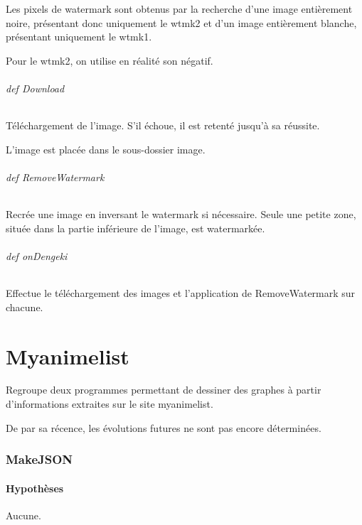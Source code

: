 \documentclass[a4paper,12pt]{article}
\begin{document}
Les pixels de watermark sont obtenus par la recherche d'une image entièrement noire, présentant donc uniquement le wtmk2 et d'un image entièrement blanche, présentant uniquement le wtmk1. 

Pour le wtmk2, on utilise en réalité son négatif.
\paragraph{def Download}
Téléchargement de l'image. S'il échoue, il est retenté jusqu'à sa réussite.

L'image est placée dans le sous-dossier image.
\paragraph{def RemoveWatermark}
Recrée une image en inversant le watermark si nécessaire. Seule une petite zone, située dans la partie inférieure de l'image, est watermarkée.
\paragraph{def onDengeki}
Effectue le téléchargement des images et l'application de RemoveWatermark sur chacune.
\part{Myanimelist}
Regroupe deux programmes permettant de dessiner des graphes à partir d'informations extraites sur le site myanimelist.

De par sa récence, les évolutions futures ne sont pas encore déterminées.
\section{MakeJSON}
\subsection{Hypothèses}
Aucune.
\end{document}
